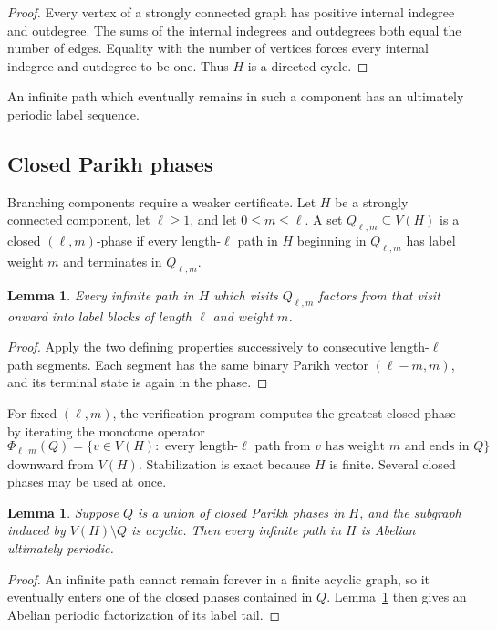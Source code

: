 \documentclass[11pt]{article}
\newtheorem{lemma}[theorem]{Lemma}
\begin{document}
\begin{proof}
Every vertex of a strongly connected graph has positive internal indegree and
outdegree. The sums of the internal indegrees and outdegrees both equal the
number of edges. Equality with the number of vertices forces every internal
indegree and outdegree to be one. Thus $H$ is a directed cycle.
\end{proof}

An infinite path which eventually remains in such a component has an
ultimately periodic label sequence.

\subsection{Closed Parikh phases}

Branching components require a weaker certificate. Let $H$ be a strongly
connected component, let $\ell\ge1$, and let $0\le m\le\ell$. A set
$Q_{\ell,m}\subseteq V(H)$ is a closed $(\ell,m)$-phase if every
length-$\ell$ path in $H$ beginning in $Q_{\ell,m}$ has label weight $m$ and
terminates in $Q_{\ell,m}$.

\begin{lemma}\label{lem:phase}
Every infinite path in $H$ which visits $Q_{\ell,m}$ factors from that visit
onward into label blocks of length $\ell$ and weight $m$.
\end{lemma}

\begin{proof}
Apply the two defining properties successively to consecutive length-$\ell$
path segments. Each segment has the same binary Parikh vector
$(\ell-m,m)$, and its terminal state is again in the phase.
\end{proof}

For fixed $(\ell,m)$, the verification program computes the greatest closed
phase by iterating the monotone operator
\[
\Phi_{\ell,m}(Q)=\{v\in V(H):\text{ every length-}\ell\text{ path from }v
\text{ has weight }m\text{ and ends in }Q\}
\]
downward from $V(H)$. Stabilization is exact because $H$ is finite. Several
closed phases may be used at once.

\begin{lemma}\label{lem:absorb}
Suppose $Q$ is a union of closed Parikh phases in $H$, and the subgraph
induced by $V(H)\setminus Q$ is acyclic. Then every infinite path in $H$ is
Abelian ultimately periodic.
\end{lemma}

\begin{proof}
An infinite path cannot remain forever in a finite acyclic graph, so it
eventually enters one of the closed phases contained in $Q$.
Lemma~\ref{lem:phase} then gives an Abelian periodic factorization of its
label tail.
\end{proof}
\end{document}

